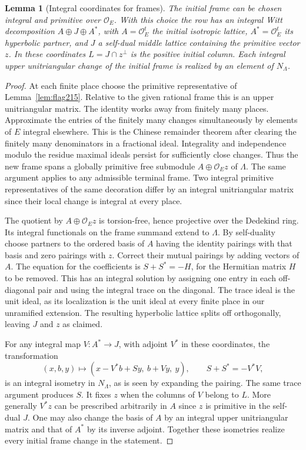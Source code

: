 \documentclass[a4paper,11pt]{article}
\newtheorem{lemma}[proposition]{Lemma}
\theoremstyle{definition}
\theoremstyle{remark}
\numberwithin{equation}{section}
\newcommand{\OO}{\mathcal O}
\begin{document}
\begin{lemma}[Integral coordinates for frames]
\label{lem:coordinates225}
The initial frame can be chosen integral and primitive over
\(\OO_E\). With this choice the row has an integral Witt
decomposition \(A\oplus J\oplus A^*\), with
\(A=\OO_E^t\) the initial isotropic lattice, \(A^*=\OO_E^t\)
its hyperbolic partner, and \(J\) a self-dual middle lattice
containing the primitive vector \(z\). In these coordinates
\(L=J\cap z^\perp\) is the positive initial column. Each
integral upper unitriangular change of the initial frame is
realized by an element of \(N_\Lambda\).
\end{lemma}
\begin{proof}
At each finite place choose the primitive representative
of Lemma~\ref{lem:flag215}. Relative to the given rational
frame this is an upper unitriangular matrix. The identity
works away from finitely many places. Approximate the
entries of the finitely many changes simultaneously by
elements of \(E\) integral elsewhere. This is the Chinese
remainder theorem after clearing the finitely many
denominators in a fractional ideal. Integrality and
independence modulo the residue maximal ideals persist for
sufficiently close changes. Thus the new frame spans a
globally primitive free submodule \(A\oplus\OO_Ez\) of
\(\Lambda\). The same argument applies to any admissible
terminal frame. Two integral primitive representatives of
the same decoration differ by an integral unitriangular
matrix since their local change is integral at every place.

The quotient by \(A\oplus\OO_Ez\) is torsion-free, hence
projective over the Dedekind ring. Its integral functionals
on the frame summand extend to \(\Lambda\). By self-duality
choose partners to the ordered basis of \(A\) having the
identity pairings with that basis and zero pairings with
\(z\). Correct their mutual pairings by adding vectors of
\(A\). The equation for the coefficients is
\(S+S^*=-H\), for the Hermitian matrix \(H\) to be removed.
This has an integral solution by assigning one entry in
each off-diagonal pair and using the integral trace on the
diagonal. The trace ideal is the unit ideal, as its
localization is the unit ideal at every finite place in
our unramified extension. The resulting hyperbolic lattice
splits off orthogonally, leaving \(J\) and \(z\) as claimed.

For any integral map \(V:A^*\to J\), with adjoint \(V^*\)
in these coordinates, the transformation
\begin{equation}
 (x,b,y)\longmapsto
       (x-V^*b+Sy,\ b+Vy,\ y),\qquad S+S^*=-V^*V ,
 \label{eq:shear225}
\end{equation}
is an integral isometry in \(N_\Lambda\), as is seen by
expanding the pairing. The same trace argument produces
\(S\). It fixes \(z\) when the columns of \(V\) belong to
\(L\). More generally \(V^*z\) can be prescribed arbitrarily
in \(A\) since \(z\) is primitive in the self-dual \(J\).
One may also change the basis of \(A\) by an integral upper
unitriangular matrix and that of \(A^*\) by its inverse
adjoint. Together these isometries realize every initial
frame change in the statement.
\end{proof}
\end{document}
